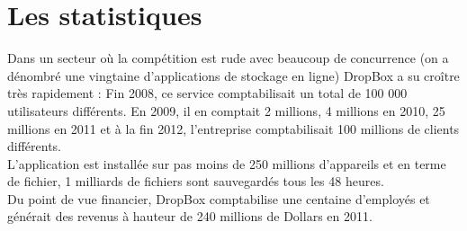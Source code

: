 \documentclass[a4paper, 10pt]{article}
\begin{document}
\newpage

\section*{Les statistiques}
Dans un secteur o\`u la comp\'etition est rude avec beaucoup de concurrence (on a d\'enombr\'e une vingtaine d'applications de stockage en ligne)
DropBox a su cro\^itre tr\`es rapidement :
Fin 2008, ce service comptabilisait un total de 100 000 utilisateurs diff\'erents.
En 2009, il en comptait 2 millions, 4 millions en 2010, 25 millions en 2011 et
\`a la fin 2012, l'entreprise comptabilisait 100 millions de clients diff\'erents.\\
L'application est install\'ee sur pas moins de 250 millions d'appareils et
en terme de fichier, 1 milliards de fichiers sont sauvegard\'es tous les 48 heures.\\
Du point de vue financier, DropBox comptabilise une centaine d'employ\'es et g\'en\'erait des revenus \`a hauteur
de 240 millions de Dollars en 2011.
\end{document}
